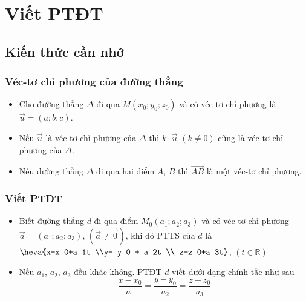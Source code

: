 \setcounter{section}{35}
\setcounter{ex}{0}
\section{Viết PTĐT}
\subsection{Kiến thức cần nhớ}
\begin{khung}
	\subsubsection{Véc-tơ chỉ phương của đường thẳng}
	\begin{itemize}
\item  Cho đường thẳng $\Delta$ đi qua $M(x_0;y_0;z_0)$ và có véc-tơ chỉ phương là $\vec{u}=(a;b;c)$.
\item Nếu $\vec{u}$ là véc-tơ chỉ phương của $\Delta$ thì $k\cdot\vec{u}$ $(k\ne 0)$ cũng là véc-tơ chỉ phương của $\Delta$.
\item Nếu đường thẳng $\Delta$ đi qua hai điểm $A$, $B$ thì $\overrightarrow{AB}$ là một véc-tơ chỉ phương.
	\end{itemize}
	\subsubsection{Viết PTĐT}
	\begin{itemize}
\item Biết đường thẳng $d$ đi qua điểm $M_0(a_1;a_2;a_3)$ và có véc-tơ chỉ phương $\vec{a}=(a_1;a_2;a_3)$, $(\vec{a}\neq \vec{0})$, khi đó PTTS của $d$ là $\heva{x=x_0+a_1t \\y= y_0 + a_2t \\ z=z_0+a_3t}$, $(t\in\mathbb{R})$
\item Nếu $a_1$, $a_2$, $a_3$ đều khác không. PTĐT $d$ viết dưới dạng chính tắc như sau
\[\dfrac{x-x_0}{a_1}=\dfrac{y-y_0}{a_2}=\dfrac{z-z_0}{a_3}\]
	\end{itemize}
\end{khung}
